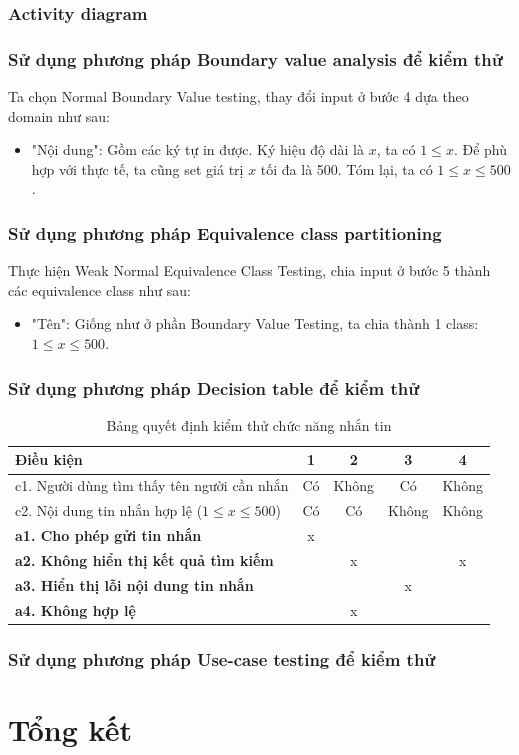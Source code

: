 \documentclass[a4paper, 12pt]{article}
\begin{document}
\subsubsection{Activity diagram}
\subsubsection{Sử dụng phương pháp Boundary value analysis để kiểm thử}
Ta chọn Normal Boundary Value testing, thay đổi input ở bước 4 dựa theo domain như sau:
\begin{itemize}
    \item "Nội dung": Gồm các ký tự in được. Ký hiệu độ dài là $x$, ta có $1 \leq x$. Để phù hợp với thực tế, ta cũng set giá trị $x$ tối đa là 500. Tóm lại, ta có $1 \leq x \leq 500$.
\end{itemize}

\subsubsection{Sử dụng phương pháp Equivalence class partitioning}
Thực hiện Weak Normal Equivalence Class Testing, chia input ở bước 5 thành các equivalence class như sau:
\begin{itemize}
    \item "Tên": Giống như ở phần Boundary Value Testing, ta chia thành 1 class: $1 \leq x \leq 500$.
\end{itemize}
\subsubsection{Sử dụng phương pháp Decision table để kiểm thử}

\begin{table}[H]
    \centering
    \begin{tabular}{|l|c|c|c|c|}
        \hline
        \textbf{Điều kiện} & \textbf{1} & \textbf{2} & \textbf{3} & \textbf{4} \\
        \hline
        c1. Người dùng tìm thấy tên người cần nhắn & Có & Không & Có & Không \\
        \hline
        c2. Nội dung tin nhắn hợp lệ ($1 \leq x \leq 500$) & Có & Có & Không & Không \\\hline
        \hline
        \textbf{a1. Cho phép gửi tin nhắn} & x & & & \\
        \hline
        \textbf{a2. Không hiển thị kết quả tìm kiếm} & & x & &x \\
        \hline
        \textbf{a3. Hiển thị lỗi nội dung tin nhắn} & & &x & \\\hline
        \textbf{a4. Không hợp lệ} & &x & & \\
        \hline
    \end{tabular}
    \caption{Bảng quyết định kiểm thử chức năng nhắn tin}
    \label{tab:decision-table}
\end{table}

\subsubsection{Sử dụng phương pháp Use-case testing để kiểm thử}

\newpage


\section{Tổng kết}
\end{document}
